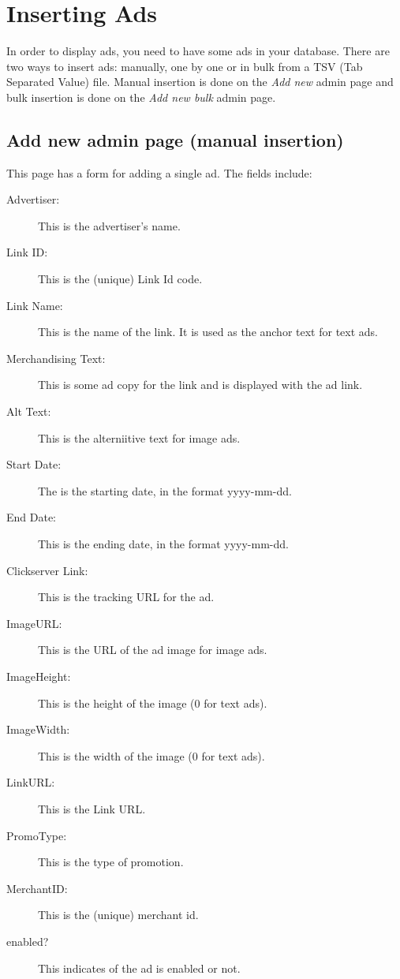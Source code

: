\documentclass[letterpaper]{article}
\begin{document}
\section{Inserting Ads}

In order to display ads, you need to have some ads in your database.
There are two ways to insert ads: manually, one by one or in bulk from
a TSV (Tab Separated Value) file. Manual insertion is done on the
\emph{Add new} admin page and bulk insertion is done on the
\emph{Add new bulk} admin page.

\subsection{Add new admin page (manual insertion)}

This page has a form for adding a single ad.  The fields include: 

\begin{description}
  \item[Advertiser:] This is the advertiser's name.
  \item[Link ID:] This is the (unique) Link Id code.
  \item[Link Name:] This is the name of the link.  It is used as the
anchor text for text ads.


  \item[Merchandising Text:] This is some ad copy for the
link and is displayed with the ad link.
  \item[Alt Text:] This is the alterniitive text for image
ads.
  \item[Start Date:] The is the starting date, in the format yyyy-mm-dd. 
  \item[End Date:] This is the ending date, in the format yyyy-mm-dd. 
  \item[Clickserver Link:] This is the tracking URL for the ad. 
  \item[ImageURL:] This is the URL of the ad image for image ads. 
  \item[ImageHeight:] This is the height of the image (0 for text ads). 
  \item[ImageWidth:] This is the width of the image (0 for text ads). 
  \item[LinkURL:] This is the Link URL.
  \item[PromoType:] This is the type of promotion.
  \item[MerchantID:] This is the (unique) merchant id.
  \item[enabled?] This indicates of the ad is enabled or
not. 
\end{description}
\end{document}
